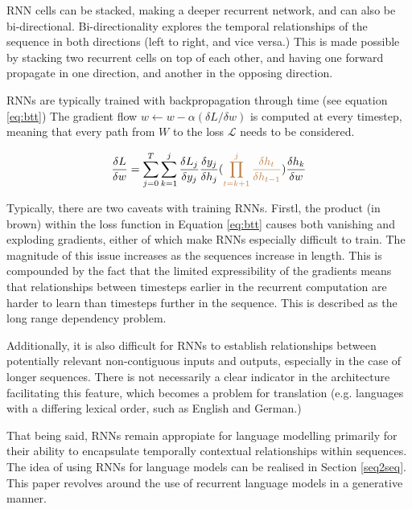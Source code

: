 \documentclass[12pt,twoside]{report}
\begin{document}
RNN cells can be stacked, making a deeper recurrent network, and can also be bi-directional. Bi-directionality explores the temporal relationships of the sequence in both directions (left to right, and vice versa.) This is made possible by stacking two recurrent cells on top of each other, and having one forward propagate in one direction, and another in the opposing direction.

RNNs are typically trained with backpropagation through time (see equation \ref{eq:btt}) The gradient flow $w \leftarrow w - \alpha ({\delta L}/{\delta w})$ is computed at every timestep, meaning that every path from $W$ to the loss $\mathcal{L}$ needs to be considered.

\begin{equation}
\label{eq:btt}
\begin{aligned}
	\frac{\delta L}{\delta w} = \sum^T_{j=0}\sum^j_{k=1}\frac{\delta L_j}{\delta y_j}\frac{\delta y_j}{\delta h_j}(\begingroup\color{brown}\prod^j_{t=k+1}\frac{\delta h_t}{\delta h_{t-1}}\endgroup)\frac{\delta h_k}{\delta w}
\end{aligned}
\end{equation}

Typically, there are two caveats with training RNNs. Firstl, the product (in brown) within the loss function in Equation \ref{eq:btt} causes both vanishing and exploding gradients, either of which make RNNs especially difficult to train. The magnitude of this issue increases as the sequences increase in length. This is compounded by the fact that the limited expressibility of the gradients means that relationships between timesteps earlier in the recurrent computation are harder to learn than timesteps further in the sequence. This is described as the long range dependency problem.

Additionally, it is also difficult for RNNs to establish relationships between potentially relevant non-contiguous inputs and outputs, especially in the case of longer sequences. There is not necessarily a clear indicator in the architecture facilitating this feature, which becomes a problem for translation (e.g. languages with a differing lexical order, such as English and German.)

That being said, RNNs remain appropiate for language modelling primarily for their ability to encapsulate temporally contextual relationships within sequences. The idea of using RNNs for language models can be realised in Section \ref{seq2seq}. This paper revolves around the use of recurrent language models in a generative manner.
\end{document}
